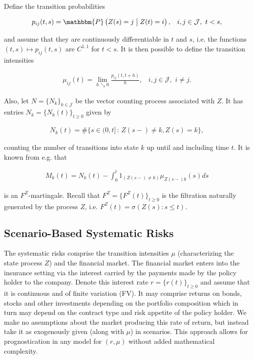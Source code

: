 \documentclass{article}
\newcommand{\1}[1]{\mathbbm{1}_{\left\lbrace #1 \right\rbrace}}
\theoremstyle{break}
\theoremstyle{remark}
\numberwithin{equation}{section}
\begin{document}
Define the transition probabilities

\begin{align*}
    p_{ij}(t,s) =  \mathbbm{P} \left( Z(s)=j \;\middle\vert\; Z(t)=i \right), \, \, \, \, \, i,j \in \mathcal{J}, \, \, t < s,
\end{align*}

and assume that they are continuously differentiable in $t$ and $s$, i.e. the functions $(t,s) \mapsto p_{ij}(t,s)$ are $C^{1,1}$ for $t < s$. It is then possible to define the transition intensities

\begin{align*}
    \mu_{ij}(t) = \lim_{h \searrow 0} \frac{p_{ij} \left( t,t+h \right)}{h}, \, \, \, \, \, i,j \in \mathcal{J}, \, \, i \neq j.
\end{align*}

Also, let $N = \{ N_{k} \}_{k \in \mathcal{J}}$ be the vector counting process associated with $Z$. It has entries $N_{k} = \{ N_{k}(t) \}_{t \geq 0}$ given by

\begin{align*}
    N_{k}(t) = \# \{ s \in (0,t] \, : \, Z(s-) \neq k, Z(s)=k \},
\end{align*}

counting the number of transitions into state $k$ up until and including time $t$. It is known from e.g. \cite{LivStok} that

\begin{align*}
    M_{k}(t) = N_{k}(t) - \int_0^t 1_{( Z(s-) \neq k)} \mu_{Z(s-)k}(s)ds
\end{align*}

is an $F^Z$-martingale. Recall that $F^Z= \{ F^Z(t) \}_{t \geq 0}$ is the filtration naturally generated by the process $Z$, i.e. $F^Z(t) = \sigma(Z(s) : s \leq t)$.

\subsection{Scenario-Based Systematic Risks}
The systematic risks comprise the transition intensities $\mu$ (characterizing the state process $Z$) and the financial market. The financial market enters into the insurance setting via the interest carried by the payments made by the policy holder to the company. Denote this interest rate $r = \{ r(t) \}_{t \geq 0}$ and assume that it is continuous and of finite variation (FV). It may comprise returns on bonds, stocks and other investments depending on the portfolio composition which in turn may depend on the contract type and risk appetite of the policy holder. We make no assumptions about the market producing this rate of return, but instead take it as exogenously given (along with $\mu$) in scenarios. This approach allows for prognostication in any model for $(r,\mu)$ without added mathematical complexity.
\end{document}
